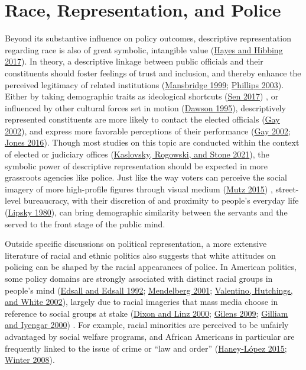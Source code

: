 \documentclass[
  12pt,
]{article}
\begin{document}
\hypertarget{race-representation-and-police}{%
\section{Race, Representation, and
Police}\label{race-representation-and-police}}

Beyond its substantive influence on policy outcomes, descriptive
representation regarding race is also of great symbolic, intangible
value (\protect\hyperlink{ref-hayes2017}{Hayes and Hibbing 2017}). In
theory, a descriptive linkage between public officials and their
constituents should foster feelings of trust and inclusion, and thereby
enhance the perceived legitimacy of related institutions
(\protect\hyperlink{ref-mansbridge1999}{Mansbridge 1999};
\protect\hyperlink{ref-phillips2003}{Phillips 2003}). Either by taking
demographic traits as ideological shortcuts
(\protect\hyperlink{ref-sen2017}{Sen 2017}) , or influenced by other
cultural forces set in motion (\protect\hyperlink{ref-dawson1995}{Dawson
1995}), descriptively represented constituents are more likely to
contact the elected officials (\protect\hyperlink{ref-gay2002}{Gay
2002}), and express more favorable perceptions of their performance
(\protect\hyperlink{ref-gay2002}{Gay 2002};
\protect\hyperlink{ref-jones2016}{Jones 2016}). Though most studies on
this topic are conducted within the context of elected or judiciary
offices (\protect\hyperlink{ref-kaslovsky2021}{Kaslovsky, Rogowski, and
Stone 2021}), the symbolic power of descriptive representation should be
expected in more grassroots agencies like police. Just like the way
voters can perceive the social imagery of more high-profile figures
through visual medium (\protect\hyperlink{ref-mutz2015}{Mutz 2015}) ,
street-level bureaucracy, with their discretion of and proximity to
people's everyday life (\protect\hyperlink{ref-lipsky1980}{Lipsky
1980}), can bring demographic similarity between the servants and the
served to the front stage of the public mind.

Outside specific discussions on political representation, a more
extensive literature of racial and ethnic politics also suggests that
white attitudes on policing can be shaped by the racial appearances of
police. In American politics, some policy domains are strongly
associated with distinct racial groups in people's mind
(\protect\hyperlink{ref-edsall1992}{Edsall and Edsall 1992};
\protect\hyperlink{ref-mendelberg2001}{Mendelberg 2001};
\protect\hyperlink{ref-valentino2002}{Valentino, Hutchings, and White
2002}), largely due to racial imageries that mass media choose in
reference to social groups at stake
(\protect\hyperlink{ref-dixon2000}{Dixon and Linz 2000};
\protect\hyperlink{ref-gilens2009}{Gilens 2009};
\protect\hyperlink{ref-gilliam2000}{Gilliam and Iyengar 2000}) . For
example, racial minorities are perceived to be unfairly advantaged by
social welfare programs, and African Americans in particular are
frequently linked to the issue of crime or ``law and order''
(\protect\hyperlink{ref-haney-luxf3pez2015}{Haney-López 2015};
\protect\hyperlink{ref-winter2008}{Winter 2008}).
\end{document}
